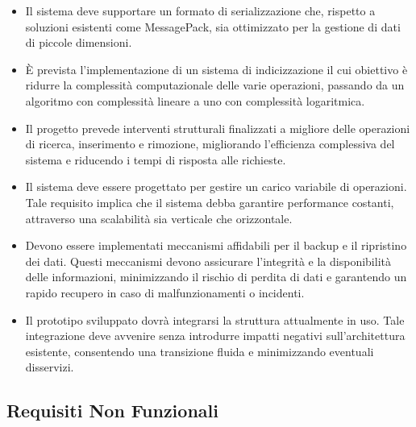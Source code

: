 \documentclass[12pt,a4paper,openright,twoside]{book}
\begin{document}
            \begin{itemize}
                \item Il sistema deve supportare un formato di serializzazione che, rispetto a soluzioni esistenti come MessagePack, sia ottimizzato per la gestione di dati di piccole dimensioni.
                \item È prevista l’implementazione di un sistema di indicizzazione il cui obiettivo è ridurre la complessità computazionale delle varie operazioni, passando da un algoritmo con complessità lineare a uno con complessità logaritmica.
                \item Il progetto prevede interventi strutturali finalizzati a migliore delle operazioni di ricerca, inserimento e rimozione, migliorando l’efficienza complessiva del sistema e riducendo i tempi di risposta alle richieste.
                \item Il sistema deve essere progettato per gestire un carico variabile di operazioni. Tale requisito implica che il sistema debba garantire performance costanti, attraverso una scalabilità sia verticale che orizzontale.
                \item Devono essere implementati meccanismi affidabili per il backup e il ripristino dei dati. Questi meccanismi devono assicurare l’integrità e la disponibilità delle informazioni, minimizzando il rischio di perdita di dati e garantendo un rapido recupero in caso di malfunzionamenti o incidenti.
                \item Il prototipo sviluppato dovrà integrarsi la struttura attualmente in uso. Tale integrazione deve avvenire senza introdurre impatti negativi sull’architettura esistente, consentendo una transizione fluida e minimizzando eventuali disservizi.
            \end{itemize}

        \subsection{Requisiti Non Funzionali}
\end{document}
